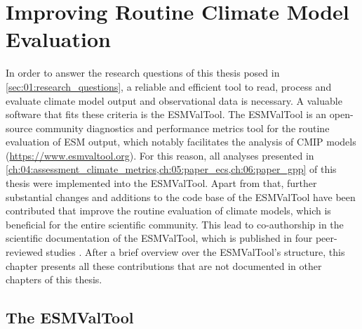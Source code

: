 


\chapter{Improving Routine Climate Model Evaluation}
\label{ch:03:esmvaltool}

In order to answer the research questions of this thesis posed in
\cref{sec:01:research_questions}, a reliable and efficient tool to read,
process and evaluate climate model output and observational data is necessary.
A valuable software that fits these criteria is the \ac{ESMValTool}. The
\ac{ESMValTool} is an open-source community diagnostics and performance metrics
tool for the routine evaluation of \ac{ESM} output, which notably facilitates
the analysis of \ac{CMIP} models (\url{https://www.esmvaltool.org}). For this
reason, all analyses presented in
\cref{ch:04:assessment_climate_metrics,ch:05:paper_ecs,ch:06:paper_gpp} of this
thesis were implemented into the \ac{ESMValTool}. Apart from that, further
substantial changes and additions to the code base of the \ac{ESMValTool} have
been contributed that improve the routine evaluation of climate models, which
is beneficial for the entire scientific community. This lead to co-authorship
in the scientific documentation of the \ac{ESMValTool}, which is published in
four peer-reviewed studies \autocite{Eyring2020, Lauer2020, Righi2020,
  Weigel2020}. After a brief overview over the \ac{ESMValTool}'s structure,
this chapter presents all these contributions that are not documented in other
chapters of this thesis.


\section{The \acf{ESMValTool}}
\label{sec:03:esmvaltool}

